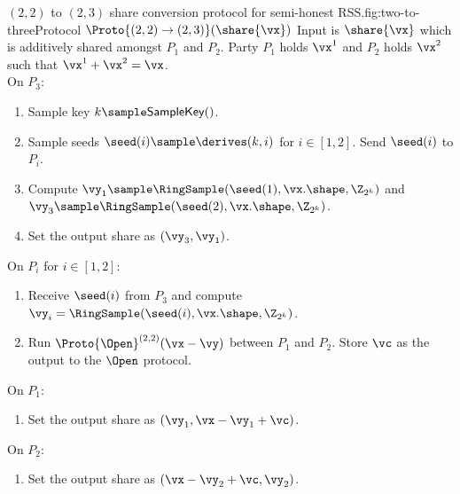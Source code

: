 
\begin{Boxfig}{$(2,2)$ to $(2,3)$ share conversion protocol for semi-honest
RSS.}{fig:two-to-three}{Protocol $\Proto{(2,2) \rightarrow (2,3)}(\share{\vx})$}
Input is $\share{\vx}$ which is additively shared amongst $P_1$ and $P_2$.
Party $P_1$ holds $\vx^1$ and $P_2$ holds $\vx^2$ such that $\vx^1 + \vx^2 = \vx$. \\
On $P_3$:
\begin{enumerate}
  \item Sample key $k \sample \mathsf{SampleKey}()$.
  \item Sample seeds $\seed(i) \sample \derives(k, i)$ for $i \in [1, 2]$. Send $\seed(i)$ to $P_i$.
  \item Compute $\vy_1 \sample \RingSample(\seed(1), \vx.\shape, \Z_{2^k})$
  and $\vy_3 \sample \RingSample(\seed(2), \vx.\shape, \Z_{2^k})$.
  \item Set
  the output share as $(\vy_3, \vy_1)$.
\end{enumerate}

On $P_i$ for $i \in [1,2]$:
\begin{enumerate}
   \item Receive $\seed(i)$ from $P_3$ and compute $\vy_i = \RingSample(\seed(i), \vx.\shape, \Z_{2^k})$.
   \item Run $\Proto{\Open}^{(2,2)}(\vx - \vy)$ between $P_1$ and $P_2$. Store $\vc$ as the output
   to the $\Open$ protocol.
\end{enumerate}

On $P_1$:
\begin{enumerate}
  \item Set the output share as $(\vy_1, \vx - \vy_1 + \vc)$.
\end{enumerate}
On $P_2$:
\begin{enumerate}
  \item Set the output share as $(\vx - \vy_2 + \vc, \vy_2)$.
\end{enumerate}
\end{Boxfig}

